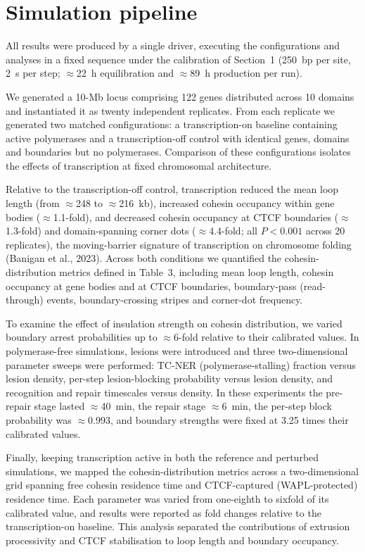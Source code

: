 \documentclass[11pt]{article}
\begin{document}
\section{Simulation pipeline}

All results were produced by a single driver, executing the configurations and
analyses in a fixed sequence under the calibration of Section~1 (250~bp per site, 2~s
per step; $\approx$22~h equilibration and $\approx$89~h production per run).

We generated a 10-Mb locus comprising 122 genes distributed across 10 domains and
instantiated it as twenty independent replicates. From each replicate we generated two
matched configurations: a transcription-on baseline containing active polymerases and a
transcription-off control with identical genes, domains and boundaries but no
polymerases. Comparison of these configurations isolates the effects of transcription
at fixed chromosomal architecture.

Relative to the transcription-off control, transcription reduced the mean loop length
(from $\approx$248 to $\approx$216~kb), increased cohesin occupancy within gene bodies
($\approx$1.1-fold), and decreased cohesin occupancy at CTCF boundaries
($\approx$1.3-fold) and domain-spanning corner dots ($\approx$4.4-fold; all $P<0.001$
across 20 replicates), the moving-barrier signature of transcription on chromosome
folding (Banigan et al., 2023). Across both conditions we quantified the
cohesin-distribution metrics defined in Table~3, including mean loop length, cohesin
occupancy at gene bodies and at CTCF boundaries, boundary-pass (read-through) events,
boundary-crossing stripes and corner-dot frequency.

To examine the effect of insulation strength on cohesin distribution, we varied
boundary arrest probabilities up to $\approx$6-fold relative to their calibrated values.
In polymerase-free simulations, lesions were introduced and three two-dimensional
parameter sweeps were performed: TC-NER (polymerase-stalling) fraction versus lesion
density, per-step lesion-blocking probability versus lesion density, and recognition and
repair timescales versus density. In these experiments the pre-repair stage lasted
$\approx$40~min, the repair stage $\approx$6~min, the per-step block probability was
$\approx$0.993, and boundary strengths were fixed at 3.25 times their calibrated values.

Finally, keeping transcription active in both the reference and perturbed simulations,
we mapped the cohesin-distribution metrics across a two-dimensional grid spanning free
cohesin residence time and CTCF-captured (WAPL-protected) residence time. Each parameter
was varied from one-eighth to sixfold of its calibrated value, and results were reported
as fold changes relative to the transcription-on baseline. This analysis separated the
contributions of extrusion processivity and CTCF stabilisation to loop length and
boundary occupancy.
\end{document}
